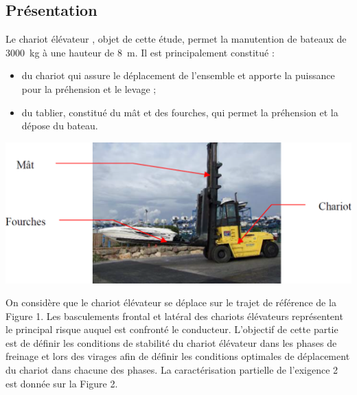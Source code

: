 \documentclass[10pt,fleqn]{article} %
\begin{document}
\def\pathfig{images}

\vspace{5cm}
\pagestyle{fancy}
\thispagestyle{plain}

\def\columnseprulecolor{\color{ocre}}
\setlength{\columnseprule}{0.4pt} 

\def\pathfig{images}

\ifprof
\else
\begin{multicols}{2}
\fi

\subsection*{Présentation}
Le chariot élévateur , objet de cette étude,  permet la manutention de bateaux de \SI{3000}{kg}
à une hauteur de \SI{8}{m}. Il est principalement constitué :
\begin{itemize}
\item du chariot qui assure le déplacement de l’ensemble et apporte la puissance pour la préhension
et le levage ;
\item du tablier, constitué du mât et des fourches, qui permet la préhension et la dépose du bateau.
\end{itemize}

\begin{center}
\includegraphics[width=\linewidth]{images/fig_01a}
\end{center} 
On considère que le chariot élévateur se déplace sur le trajet de référence de la Figure 1. Les basculements frontal et latéral des chariots élévateurs représentent le principal risque auquel est confronté le conducteur. L’objectif de cette partie est de définir les conditions de stabilité du chariot élévateur dans les phases de freinage et lors des virages afin de définir les conditions optimales de déplacement du chariot dans chacune des phases.
La caractérisation partielle de l'exigence 2 est donnée sur la Figure 2.




\end{multicols}
\end{document}
